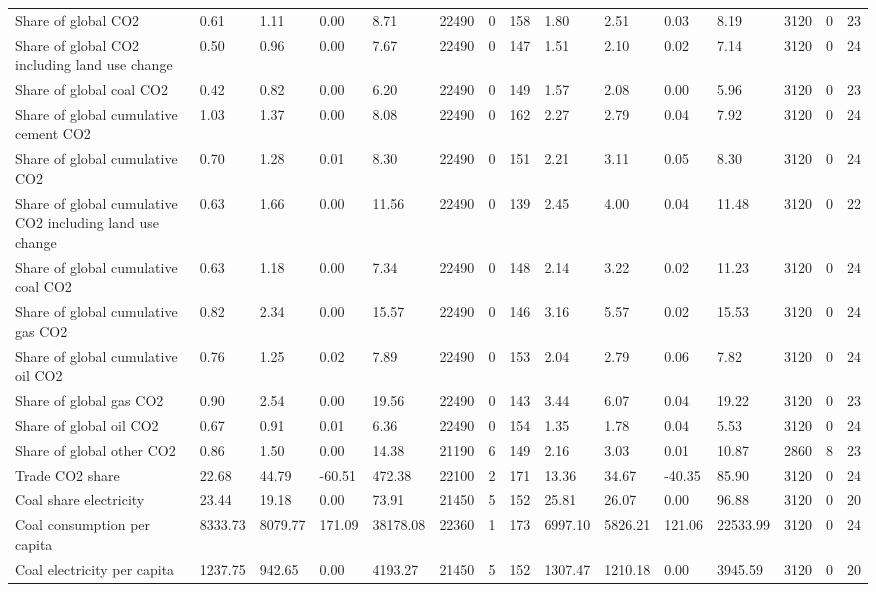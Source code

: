 \begin{longtable}{lllllllllllllll}
Share of global CO2 & 0.61 & 1.11 & 0.00 & 8.71 & 22490 & 0 & 158 & 1.80 & 2.51 & 0.03 & 8.19 & 3120 & 0 & 23\\
Share of global CO2 including land use change & 0.50 & 0.96 & 0.00 & 7.67 & 22490 & 0 & 147 & 1.51 & 2.10 & 0.02 & 7.14 & 3120 & 0 & 24\\
Share of global coal CO2 & 0.42 & 0.82 & 0.00 & 6.20 & 22490 & 0 & 149 & 1.57 & 2.08 & 0.00 & 5.96 & 3120 & 0 & 23\\
\addlinespace
Share of global cumulative cement CO2 & 1.03 & 1.37 & 0.00 & 8.08 & 22490 & 0 & 162 & 2.27 & 2.79 & 0.04 & 7.92 & 3120 & 0 & 24\\
Share of global cumulative CO2 & 0.70 & 1.28 & 0.01 & 8.30 & 22490 & 0 & 151 & 2.21 & 3.11 & 0.05 & 8.30 & 3120 & 0 & 24\\
Share of global cumulative CO2 including land use change & 0.63 & 1.66 & 0.00 & 11.56 & 22490 & 0 & 139 & 2.45 & 4.00 & 0.04 & 11.48 & 3120 & 0 & 22\\
Share of global cumulative coal CO2 & 0.63 & 1.18 & 0.00 & 7.34 & 22490 & 0 & 148 & 2.14 & 3.22 & 0.02 & 11.23 & 3120 & 0 & 24\\
Share of global cumulative gas CO2 & 0.82 & 2.34 & 0.00 & 15.57 & 22490 & 0 & 146 & 3.16 & 5.57 & 0.02 & 15.53 & 3120 & 0 & 24\\
\addlinespace
Share of global cumulative oil CO2 & 0.76 & 1.25 & 0.02 & 7.89 & 22490 & 0 & 153 & 2.04 & 2.79 & 0.06 & 7.82 & 3120 & 0 & 24\\
Share of global gas CO2 & 0.90 & 2.54 & 0.00 & 19.56 & 22490 & 0 & 143 & 3.44 & 6.07 & 0.04 & 19.22 & 3120 & 0 & 23\\
Share of global oil CO2 & 0.67 & 0.91 & 0.01 & 6.36 & 22490 & 0 & 154 & 1.35 & 1.78 & 0.04 & 5.53 & 3120 & 0 & 24\\
Share of global other CO2 & 0.86 & 1.50 & 0.00 & 14.38 & 21190 & 6 & 149 & 2.16 & 3.03 & 0.01 & 10.87 & 2860 & 8 & 23\\
Trade CO2 share & 22.68 & 44.79 & -60.51 & 472.38 & 22100 & 2 & 171 & 13.36 & 34.67 & -40.35 & 85.90 & 3120 & 0 & 24\\
\addlinespace
Coal share electricity & 23.44 & 19.18 & 0.00 & 73.91 & 21450 & 5 & 152 & 25.81 & 26.07 & 0.00 & 96.88 & 3120 & 0 & 20\\
Coal consumption per capita & 8333.73 & 8079.77 & 171.09 & 38178.08 & 22360 & 1 & 173 & 6997.10 & 5826.21 & 121.06 & 22533.99 & 3120 & 0 & 24\\
Coal electricity per capita & 1237.75 & 942.65 & 0.00 & 4193.27 & 21450 & 5 & 152 & 1307.47 & 1210.18 & 0.00 & 3945.59 & 3120 & 0 & 20\\

\end{longtable}
